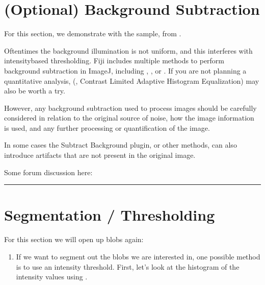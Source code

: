 \documentclass[letterpaper,10pt,english]{jupyterBook}
\begin{document}
\section{(Optional) Background Subtraction}
\label{\detokenize{basic-segmentation:optional-background-subtraction}}
\sphinxAtStartPar
For this section, we demonstrate with the  sample, from .

\sphinxAtStartPar
Oftentimes the background illumination is not uniform, and this interferes with intensity\sphinxhyphen{}based thresholding. Fiji includes multiple methods to perform background subtraction in ImageJ, including , , or . If you are not planning a quantitative analysis,  (, Contrast Limited Adaptive Histogram Equalization) may also be worth a try.

\sphinxAtStartPar
{}

\sphinxAtStartPar
However, any background subtraction used to process images should be carefully considered in relation to the original source of noise, how the image information is used, and any further processing or quantification of the image.

\sphinxAtStartPar
In some cases the Subtract Background plugin, or other methods, can also introduce artifacts that are not present in the original image.

\sphinxAtStartPar
Some  forum discussion here:\\


\bigskip\hrule\bigskip



\section{Segmentation / Thresholding}
\label{\detokenize{basic-segmentation:segmentation-thresholding}}
\sphinxAtStartPar
For this section we will open up blobs again: 
\begin{enumerate}
%
\item {} 
\sphinxAtStartPar
If we want to segment out the blobs we are interested in, one possible method is to use an intensity threshold. First, let’s look at the histogram of the intensity values using .

\end{enumerate}
\end{document}
